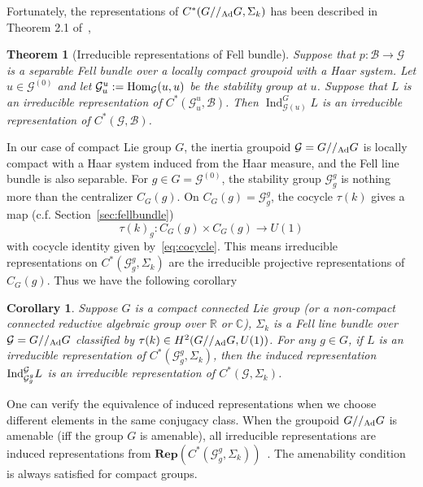 \documentclass[a4paper,11pt]{article}
\newtheorem{theorem}[lemma]{Theorem}
\newtheorem{corollary}[lemma]{Corollary}
\newcommand{\Rep}{\textbf{Rep}}
\newcommand{\be}{\begin{equation}}
\newcommand{\ee}{\end{equation}}
\def\bbC{\mathbb{C}}
\def\bbR{\mathbb{R}}
\def\CG{\mathcal{G}}
\def\gmg{G//_{\rm Ad} G}
\begin{document}
Fortunately, the representations of $C^*(\gmg,\Sigma_k)$ has been described in Theorem 2.1 of~\cite{Ionescu:2013},
\begin{theorem}[Irreducible representations of Fell bundle]
    Suppose that $p: \mathscr{B} \rightarrow \CG$ is a separable Fell bundle over a locally compact groupoid with a Haar system. Let $u \in \CG^{(0)}$ and let $\CG_u^u:={\rm Hom}_{\CG}(u,u) $ be the stability group at $u$. Suppose that $L$ is an irreducible representation of $C^*(\CG_u^u, \mathscr{B})$. Then $\operatorname{Ind}_{\CG(u)}^G L$ is an irreducible representation of $C^*(\CG, \mathscr{B})$.
\end{theorem}
In our case of compact Lie group $G$, the inertia groupoid $\CG =\gmg$ is locally compact with a Haar system induced from the Haar measure, and the Fell line bundle is also separable. For $g\in G = \CG^{(0)}$, the stability group $\CG_g^g$ is nothing more than the centralizer $C_G(g)$. On $C_G(g) = \CG_g^g$, the cocycle $\tau(k)$ gives a map (c.f. Section~\ref{sec:fellbundle})
\be\label{eq:transgrprojrep} \tau(k)_g:  C_G(g) \times C_G(g) \to U(1)  \ee
with cocycle identity given by~\eqref{eq:cocycle}. This means irreducible representations on $C^*(\CG_g^g,\Sigma_k)$ are the irreducible projective representations of $C_G(g)$. Thus we have the following corollary
\begin{corollary}
    Suppose $G$ is a compact connected Lie group (or a non-compact connected reductive algebraic group over $\bbR$ or $\bbC$), $\Sigma_k$ is a Fell line bundle over $\CG = G//_{\rm Ad} G$ classified by $\tau(k)\in H^2(\gmg,U(1))$. For any $g\in G$, if $L$ is an irreducible representation of $C^*(\CG_g^g ,\Sigma_k)$, then the induced representation ${\rm Ind}_{\CG^g_g}^{\CG}L$ is an irreducible representation of $C^*(\CG ,\Sigma_k)$.
\end{corollary}
One can verify the equivalence of induced representations when we choose different elements in the same conjugacy class. When the groupoid $\gmg$ is amenable (iff the group $G$ is amenable), all irreducible representations are induced representations from $\Rep(C^*(\CG_g^g ,\Sigma_k))$~\cite{Ionescu:2009}. The amenability condition is always satisfied for compact groups.
\end{document}
